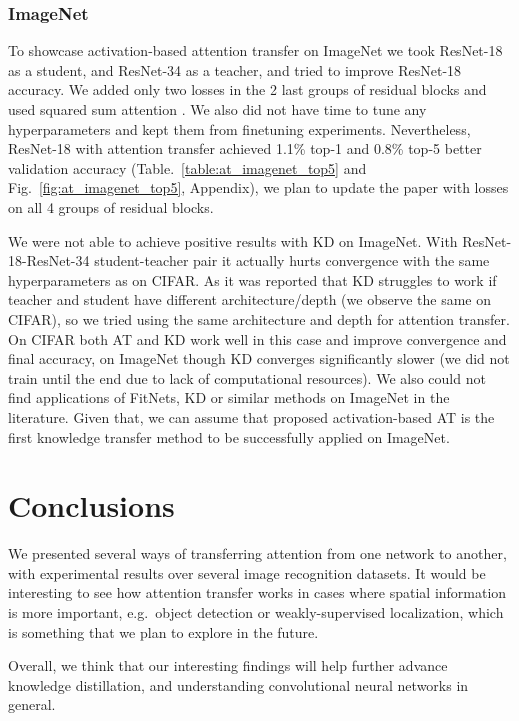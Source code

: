\documentclass{article} \usepackage{iclr2017_conference}
\begin{document}
\subsubsection{ImageNet}

To showcase activation-based attention transfer on ImageNet we took ResNet-18 as a student, and ResNet-34 as a teacher, and tried to improve ResNet-18 accuracy. We added only two losses in the 2 last groups of residual blocks and used squared sum attention . We also did not have time to tune any hyperparameters and kept them from finetuning experiments. Nevertheless, ResNet-18 with attention transfer achieved 1.1\% top-1 and 0.8\% top-5 better validation accuracy (Table.~\ref{table:at_imagenet_top5} and Fig.~\ref{fig:at_imagenet_top5}, Appendix), we plan to update the paper with losses on all 4 groups of residual blocks.

We were not able to achieve positive results with KD on ImageNet. With ResNet-18-ResNet-34 student-teacher pair it actually hurts convergence with the same hyperparameters as on CIFAR. As it was reported that KD struggles to work if teacher and student have different architecture/depth (we observe the same on CIFAR), so we tried using the same architecture and depth for attention transfer. On CIFAR both AT and KD work well in this case and improve convergence and final accuracy, on ImageNet though KD converges significantly slower (we did not train until the end due to lack of computational resources). We also could not find applications of FitNets, KD or similar methods on ImageNet in the literature. Given that, we can assume that proposed activation-based AT is the first knowledge transfer method to be successfully applied on ImageNet.


\section{Conclusions}\label{sec:conclusions}

We presented several ways of transferring attention from one network to another, with experimental results over several image recognition datasets. It would be interesting to see how attention transfer works in cases where spatial information is more important, e.g.\ object detection or weakly-supervised localization, which is something that we plan to explore in the future.

Overall, we think that our interesting findings will help further advance knowledge distillation, and understanding convolutional neural networks in general.
\end{document}
